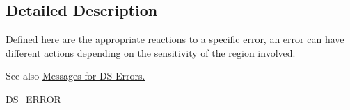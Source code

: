 \subsection{Detailed Description}
Defined here are the appropriate reactions to a specific error, an error can have different actions depending on the sensitivity of the region involved. \begin{DoxySeeAlso}{See also}
\hyperlink{group___m___d_s___messages}{Messages for DS Errors.} 

DS\_\-ERROR 
\end{DoxySeeAlso}
